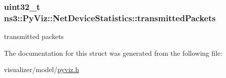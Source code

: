 \subsubsection[{\texorpdfstring{transmitted\+Packets}{transmittedPackets}}]{\setlength{\rightskip}{0pt plus 5cm}uint32\+\_\+t ns3\+::\+Py\+Viz\+::\+Net\+Device\+Statistics\+::transmitted\+Packets}\hypertarget{structns3_1_1PyViz_1_1NetDeviceStatistics_abf697ec59ef822d3a90805f757dd1cf1}{}\label{structns3_1_1PyViz_1_1NetDeviceStatistics_abf697ec59ef822d3a90805f757dd1cf1}


transmitted packets 



The documentation for this struct was generated from the following file\+:\begin{DoxyCompactItemize}
\item 
visualizer/model/\hyperlink{pyviz_8h}{pyviz.\+h}\end{DoxyCompactItemize}
